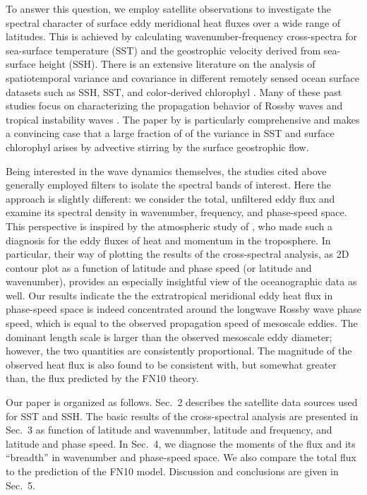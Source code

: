 \documentclass[10pt]{article}
\begin{document}
To answer this question, we employ satellite observations to investigate the spectral character of surface eddy meridional heat fluxes over a wide range of latitudes. This is achieved by calculating wavenumber-frequency cross-spectra for sea-surface temperature (SST) and the geostrophic velocity derived from sea-surface height (SSH). There is an extensive literature on the analysis of spatiotemporal variance and covariance in different remotely sensed ocean surface datasets such as SSH, SST, and color-derived chlorophyl \citep[see review by][]{OBrienEtAl2013}. Many of these past studies focus on characterizing the propagation behavior of Rossby waves \citep{CheltonSchalx1996,PolitoCornillon1997,CipolliniEtAl1997,HillEtAl2000,CipolliniEtAl2001,PolitoLiu2003,KillworthEtAl2004} and tropical instability waves \citep{PolitoEtAl2001,Contreras2002,CheltonEtAl2000,LeeEtAl2012}. The paper by \citet{KillworthEtAl2004} is particularly comprehensive and makes a convincing case that a large fraction of of the variance in SST and surface chlorophyl arises by advective stirring by the surface geostrophic flow.

Being interested in the wave dynamics themselves, the studies cited above generally employed filters to isolate the spectral bands of interest. Here the approach is slightly different: we consider the total, unfiltered eddy flux and examine its spectral density in wavenumber, frequency, and phase-speed space. This perspective is inspired by the atmospheric study of \citet{RandelHeld1991}, who made such a diagnosis for the eddy fluxes of heat and momentum in the troposphere. In particular, their way of plotting the results of the cross-spectral analysis, as 2D contour plot as a function of latitude and phase speed (or latitude and wavenumber), provides an especially insightful view of the oceanographic data as well. Our results indicate the the extratropical meridional eddy heat flux in phase-speed space is indeed concentrated around the longwave Rossby wave phase speed, which is equal to the observed propagation speed of mesoscale eddies. The dominant length scale is larger than the observed mesoscale eddy diameter; however, the two quantities are consistently proportional. The magnitude of the observed heat flux is also found to be consistent with, but somewhat greater than, the flux predicted by the FN10 theory.

Our paper is organized as follows. Sec.~2 describes the satellite data sources used for SST and SSH. The basic results of the cross-spectral analysis are presented in Sec.~3 as function of latitude and wavenumber, latitude and frequency, and latitude and phase speed. In Sec.~4, we diagnose the moments of the flux and its ``breadth'' in wavenumber and phase-speed space. We also compare the total flux to the prediction of the FN10 model. Discussion and conclusions are given in Sec.~5.
\end{document}
